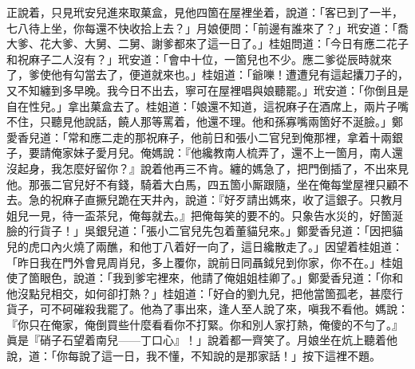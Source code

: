 正說着，只見玳安兒進來取菓盒，見他四箇在屋裡坐着，說道：「客已到了一半，七八待上坐，你每還不快收拾上去？」月娘便問：「前邊有誰來了？」玳安道：「喬大爹、花大爹、大舅、二舅、謝爹都來了這一日了。」桂姐問道：「今日有應二花子和祝麻子二人沒有？」玳安道：「會中十位，一箇兒也不少。應二爹從辰時就來了，爹使他有勾當去了，便道就來也。」桂姐道：「爺嚛！遭遭兒有這起攮刀子的，又不知纏到多早晚。我今日不出去，寧可在屋裡唱與娘聽罷。」{}玳安道：「你倒且是自在性兒。」拿出菓盒去了。桂姐道：「娘還不知道，這祝麻子在酒席上，兩片子嘴不住，只聽見他說話，饒人那等罵着，他還不理。他和孫寡嘴兩箇好不涎臉。」{}鄭愛香兒道：「常和應二走的那祝麻子，他前日和張小二官兒到俺那裡，拿着十兩銀子，要請俺家妹子愛月兒。{}俺媽說：『他纔教南人梳弄了，還不上一箇月，南人還沒起身，我怎麼好留你？』說着他再三不肯。纏的媽急了，把門倒插了，不出來見他。那張二官兒好不有錢，騎着大白馬，四五箇小厮跟隨，坐在俺每堂屋裡只顧不去。{}急的祝麻子直撅兒跪在天井內，說道：『好歹請出媽來，收了這銀子。只教月姐兒一見，待一盃茶兒，俺每就去。』把俺每笑的要不的。只象告水災的，好箇涎臉的行貨子！」吳銀兒道：「張小二官兒先包着董貓兒來。」鄭愛香兒道：「因把貓兒的虎口內火燒了兩醮，和他丁八着好一向了，這日纔散走了。」因望着桂姐道：「昨日我在門外會見周肖兒，多上覆你，說前日同聶鉞兒到你家，你不在。」桂姐使了箇眼色，說道：「我到爹宅裡來，他請了俺姐姐桂卿了。」鄭愛香兒道：「你和他沒點兒相交，如何卻打熱？」桂姐道：「好㒲的劉九兒，{}把他當箇孤老，甚麼行貨子，可不砢磪殺我罷了。他為了事出來，逢人至人說了來，嗔我不看他。媽說：『你只在俺家，俺倒買些什麼看看你不打緊。你和別人家打熱，俺傻的不勻了。』眞是『硝子石望着南兒——丁口心』！」說着都一齊笑了。月娘坐在炕上聽着他說，道：「你每說了這一日，我不懂，不知說的是那家話！」按下這裡不題。

